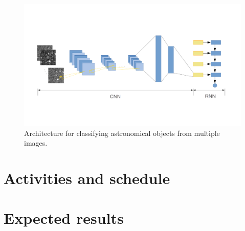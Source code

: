 \begin{figure}[H]
  \centering
  \includegraphics[width=1.05\textwidth]{CNNRNNDiagram.png}
  \caption{Architecture for classifying astronomical objects from multiple images.}
\end{figure}

\section{Activities and schedule}


\section{Expected results}


\newpage
\printbibliography

